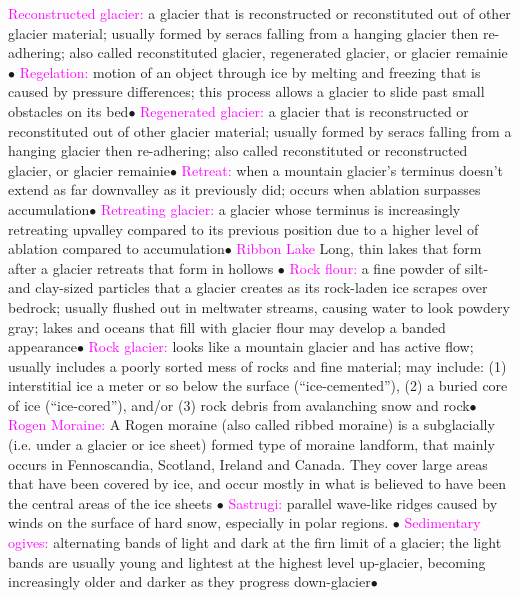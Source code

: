 \documentclass{article}
\newcommand{\ddd}{$\bullet$}
\newcommand{\pink}[1]{\textcolor{magenta}{#1}}
\newcommand{\vocab}[1]{{\pink{#1}}}
\begin{document}
\begin{multicols*}{4}
		\vocab{        Reconstructed glacier: } a glacier that is reconstructed or reconstituted out of other glacier material; usually formed by seracs falling from a hanging glacier then re-adhering; also called reconstituted glacier, regenerated glacier, or glacier remainie\ddd
		\vocab{        Regelation: } motion of an object through ice by melting and freezing that is caused by pressure differences; this process allows a glacier to slide past small obstacles on its bed\ddd
		\vocab{        Regenerated glacier: } a glacier that is reconstructed or reconstituted out of other glacier material; usually formed by seracs falling from a hanging glacier then re-adhering; also called reconstituted or reconstructed glacier, or glacier remainie\ddd
		\vocab{        Retreat: } when a mountain glacier's terminus doesn't extend as far downvalley as it previously did; occurs when ablation surpasses accumulation\ddd
		\vocab{        Retreating glacier: } a glacier whose terminus is increasingly retreating upvalley compared to its previous position due to a higher level of ablation compared to accumulation\ddd
		\vocab{Ribbon Lake} Long, thin lakes that form after a glacier retreats that form in hollows \ddd
		\vocab{        Rock flour: } a fine powder of silt- and clay-sized particles that a glacier creates as its rock-laden ice scrapes over bedrock; usually flushed out in meltwater streams, causing water to look powdery gray; lakes and oceans that fill with glacier flour may develop a banded appearance\ddd
		\vocab{        Rock glacier: } looks like a mountain glacier and has active flow; usually includes a poorly sorted mess of rocks and fine material; may include: (1) interstitial ice a meter or so below the surface (“ice-cemented”), (2) a buried core of ice (“ice-cored”), and/or (3) rock debris from avalanching snow and rock\ddd
		\vocab{        Rogen Moraine: } A Rogen moraine (also called ribbed moraine) is a subglacially (i.e. under a glacier or ice sheet) formed type of moraine landform, that mainly occurs in Fennoscandia, Scotland, Ireland and Canada. They cover large areas that have been covered by ice, and occur mostly in what is believed to have been the central areas of the ice sheets \ddd
		\vocab{        Sastrugi: } parallel wave-like ridges caused by winds on the surface of hard snow, especially in polar regions. \ddd
		\vocab{        Sedimentary ogives: } alternating bands of light and dark at the firn limit of a glacier; the light bands are usually young and lightest at the highest level up-glacier, becoming increasingly older and darker as they progress down-glacier\ddd

\end{multicols*}
\end{document}
